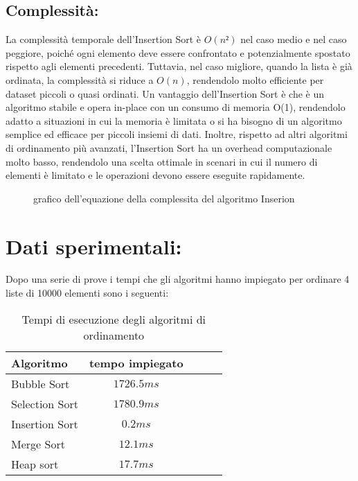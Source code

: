 \documentclass[a4paper]{article}
\begin{document}
\subsection{Complessità:}
La complessità temporale dell’Insertion Sort è \(O(n²)\) nel caso medio e nel caso peggiore, poiché ogni elemento deve essere confrontato e potenzialmente
spostato rispetto agli elementi precedenti. Tuttavia, nel caso migliore, quando la lista è già ordinata, la complessità si riduce a \(O(n)\), rendendolo
molto efficiente per dataset piccoli o quasi ordinati. Un vantaggio dell’Insertion Sort è che è un algoritmo stabile e opera in-place con un consumo 
di memoria O(1), rendendolo adatto a situazioni in cui la memoria è limitata o si ha bisogno di un algoritmo semplice ed efficace per piccoli insiemi 
di dati. Inoltre, rispetto ad altri algoritmi di ordinamento più avanzati, l'Insertion Sort ha un overhead computazionale molto basso, rendendolo una 
scelta ottimale in scenari in cui il numero di elementi è limitato e le operazioni devono essere eseguite rapidamente.
\begin{figure}[h]
    \caption{grafico dell'equazione della complessita del algoritmo Inserion}
\end{figure}
\section{Dati sperimentali:}
Dopo una serie di prove i tempi che gli algoritmi hanno impiegato per ordinare 4 liste di 10000 elementi sono i seguenti:
\begin{table}[h]
    \centering
    \caption{Tempi di esecuzione degli algoritmi di ordinamento}
    \begin{tabular}{lcccc}
    \toprule
    \textbf{Algoritmo} & \textbf{tempo impiegato} \\
    \midrule
    Bubble Sort & $1726.5 ms $ \\
    Selection Sort & $1780.9 ms$ \\
    Insertion Sort & $0.2 ms$ \\
    Merge Sort & $12.1 ms$ \\
    Heap sort & $17.7 ms$ \\
    \bottomrule
    \end{tabular}
    \label{tab:sorting-algorithms}
\end{table}
\newpage
\end{document}
